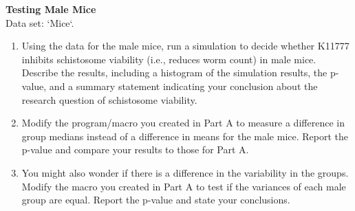 \documentclass[
]{report}
\begin{document}
\begin{list}{E.}{ \setlength{\itemsep}{0.5em}}
  \item \textbf{Testing Male Mice} \\
  Data set: `Mice`. 
  \begin{enumerate}
    \setcounter{enumi}{0}  
    \item Using the data for the male mice, run a simulation to decide whether K11777 inhibits schistosome
viability (i.e., reduces worm count) in male mice. Describe the results, including a histogram
of the simulation results, the p-value, and a summary statement indicating your conclusion
about the research question of schistosome viability.
    \item Modify the program/macro you created in Part A to measure a difference in group medians
instead of a difference in means for the male mice. Report the p-value and compare your results
to those for Part A.
    \item You might also wonder if there is a difference in the variability in the groups. Modify the macro
you created in Part A to test if the variances of each male group are equal. Report the p-value and
state your conclusions.
  \end{enumerate}
  
  
  

\end{list}
\end{document}
